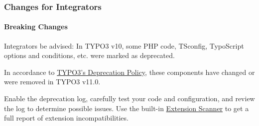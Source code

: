 %

\begin{frame}[fragile]
	\frametitle{Changes for Integrators}
	\framesubtitle{Breaking Changes}

	\small
		Integrators be advised: In TYPO3 v10, some PHP code, TSconfig, TypoScript
		options and conditions, etc. were marked as deprecated.

		\vspace{0.2cm}

		In accordance to
		\href{https://typo3.org/article/typo3-deprecation-policy}{TYPO3's Deprecation Policy},
		these components have changed or were removed in TYPO3 v11.0.

		\vspace{0.2cm}

		Enable the deprecation log, carefully test your code and configuration,
		and review the log to determine possible issues. Use the built-in
		\href{https://docs.typo3.org/m/typo3/reference-coreapi/master/en-us/ApiOverview/ExtensionScanner/Index.html}{Extension Scanner}
		to get a full report of extension incompatibilities.

	\normalsize

\end{frame}


